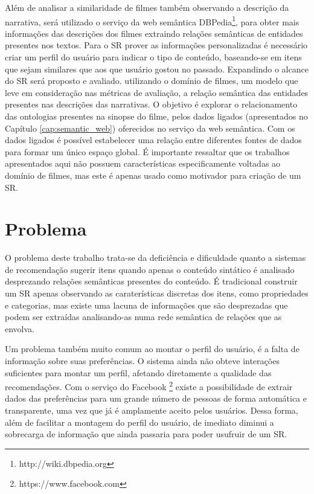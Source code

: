 Além de analisar a similaridade de filmes também observando a descrição da narrativa, será utilizado o serviço da web semântica DBPedia\footnote{http://wiki.dbpedia.org}, para obter mais informações das descrições dos filmes extraindo relações semânticas de entidades presentes nos textos. Para o SR prover as informações personalizadas é necessário criar um perfil do usuário para indicar o tipo de conteúdo, baseando-se em itens que sejam similares que aos que usuário gostou no passado. Expandindo o alcance do SR será proposto e avaliado. utilizando o domínio de filmes, um modelo que leve em consideração nas métricas de avaliação, a relação semântica das entidades presentes nas descrições das narrativas. O objetivo é explorar o relacionamento das ontologias presentes na sinopse do filme, pelos dados ligados (apresentados no Capítulo \ref{cap:semantic_web}) oferecidos no serviço da web semântica. Com os dados ligados é possível estabelecer uma relação entre diferentes fontes de dados para formar um único espaço global. É importante ressaltar que os trabalhos apresentados aqui não possuem características especificamente voltadas ao domínio de filmes, mas este é apenas usado como motivador para criação de um SR.

\section{Problema}
O problema deste trabalho trata-se da deficiência e dificuldade quanto a sistemas de recomendação sugerir itens quando apenas o conteúdo sintático é analisado desprezando relações semânticas presentes do conteúdo. É tradicional construir um SR apenas observando as caraterísticas discretas dos itens, como propriedades e categorias, mas existe uma lacuna de informações que são desprezadas que podem ser extraídas analisando-as numa rede semântica de relações que as envolva.

Um problema também muito comum ao montar o perfil do usuário, é a falta de informação sobre suas preferências. O sistema ainda não obteve interações suficientes para montar um perfil, afetando diretamente a qualidade das recomendações. Com o serviço do Facebook \footnote{https://www.facebook.com} existe a possibilidade de extrair dados das preferências para um grande número de pessoas de forma automática e transparente, uma vez que já é amplamente aceito pelos usuários. Dessa forma, além de facilitar a montagem do perfil do usuário, de imediato diminui a sobrecarga de informação que ainda passaria para poder usufruir de um SR.

